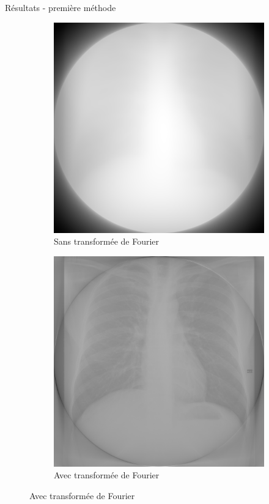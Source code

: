 \documentclass{beamer}
\begin{document}
\begin{frame}{Résultats - première méthode}
    \begin{figure}[t]
        \centering
        \begin{subfigure}[b]{0.35\textwidth}
            \includegraphics[width=\textwidth]{thoraSansFFT.png}
            \caption{Sans transformée de Fourier}
        \end{subfigure}
        \qquad \qquad 
        \pause
        \begin{subfigure}[b]{0.35\textwidth}
            \includegraphics[width=\textwidth]{thoraxAvecFFT.png}
            \caption{Avec transformée de Fourier}
        \end{subfigure}
    \end{figure}
\end{frame}
\end{document}
